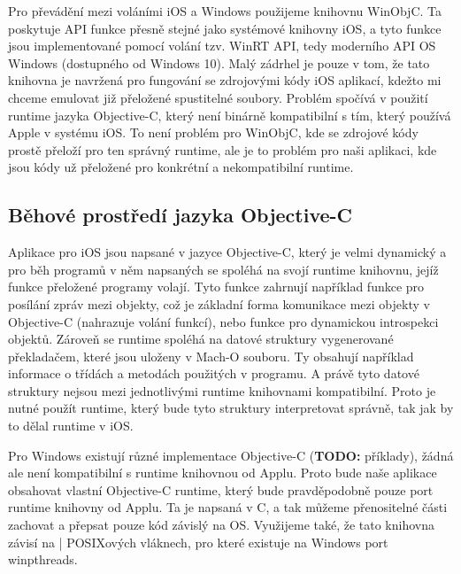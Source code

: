 \documentclass[12pt]{article}
\newcommand{\Rplus}{\protect\hspace{-.1em}\protect\raisebox{.35ex}{\smaller{\smaller\textbf{+}}}}
\newcommand{\Cpp}{\mbox{C\Rplus\Rplus}\xspace}
\begin{document}
Pro převádění mezi voláními iOS a Windows použijeme knihovnu WinObjC.
Ta poskytuje API funkce přesně stejné jako systémové knihovny iOS, a tyto funkce jsou implementované pomocí volání tzv. WinRT API, tedy moderního API OS Windows (dostupného od Windows 10).
Malý zádrhel je pouze v tom, že tato knihovna je navržená pro fungování se zdrojovými kódy iOS aplikací, kdežto mi chceme emulovat již přeložené spustitelné soubory.
Problém spočívá v použití runtime jazyka Objective-C, který není binárně kompatibilní s tím, který používá Apple v systému iOS.
To není problém pro WinObjC, kde se zdrojové kódy prostě přeloží pro ten správný runtime, ale je to problém pro naši aplikaci, kde jsou kódy už přeložené pro konkrétní a nekompatibilní runtime.

\subsection*{Běhové prostředí jazyka Objective-C}

Aplikace pro iOS jsou napsané v jazyce Objective-C, který je velmi dynamický a pro běh programů v něm napsaných se spoléhá na svojí runtime knihovnu, jejíž funkce přeložené programy volají.
Tyto funkce zahrnují například funkce pro posílání zpráv mezi objekty, což je základní forma komunikace mezi objekty v Objective-C (nahrazuje volání funkcí), nebo funkce pro dynamickou introspekci objektů.
Zároveň se runtime spoléhá na datové struktury vygenerované překladačem, které jsou uloženy v Mach-O souboru.
Ty obsahují například informace o třídách a metodách použitých v programu.
A právě tyto datové struktury nejsou mezi jednotlivými runtime knihovnami kompatibilní.
Proto je nutné použít runtime, který bude tyto struktury interpretovat správně, tak jak by to dělal runtime v iOS.

Pro Windows existují různé implementace Objective-C (\textbf{TODO:} příklady), žádná ale není kompatibilní s runtime knihovnou od Applu.
Proto bude naše aplikace obsahovat vlastní Objective-C runtime, který bude pravděpodobně pouze port runtime knihovny od Applu.
Ta je napsaná v \Cpp, a tak můžeme přenositelné části zachovat a přepsat pouze kód závislý na OS.
Využijeme také, že tato knihovna závisí na | POSIXových vláknech, pro které existuje na Windows port winpthreads.



\end{document}
